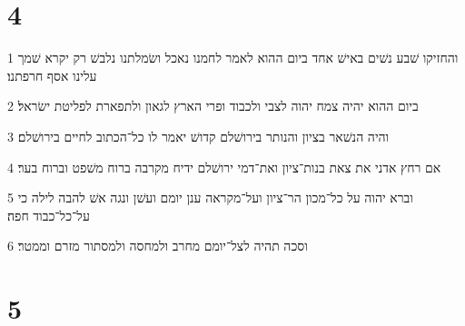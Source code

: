 \chapter{4}

\par 1 והחזיקו שׁבע נשׁים באישׁ אחד ביום ההוא לאמר לחמנו נאכל ושׂמלתנו נלבשׁ רק יקרא שׁמך עלינו אסף חרפתנו׃
\par 2 ביום ההוא יהיה צמח יהוה לצבי ולכבוד ופרי הארץ לגאון ולתפארת לפליטת ישׂראל׃
\par 3 והיה הנשׁאר בציון והנותר בירושׁלם קדושׁ יאמר לו כל־הכתוב לחיים בירושׁלם׃
\par 4 אם רחץ אדני את צאת בנות־ציון ואת־דמי ירושׁלם ידיח מקרבה ברוח משׁפט וברוח בער׃
\par 5 וברא יהוה על כל־מכון הר־ציון ועל־מקראה ענן יומם ועשׁן ונגה אשׁ להבה לילה כי על־כל־כבוד חפה׃
\par 6 וסכה תהיה לצל־יומם מחרב ולמחסה ולמסתור מזרם וממטר׃

\chapter{5}


